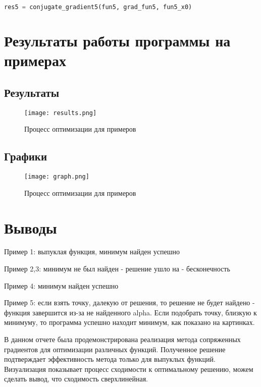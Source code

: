 \documentclass{article}
\begin{document}
\begin{lstlisting}[language=Python]
res5 = conjugate_gradient5(fun5, grad_fun5, fun5_x0)
\end{lstlisting}

\newpage
\section{Результаты работы программы на примерах}
\subsection{Результаты}

\begin{figure}[H]
    \centering
    \texttt{[image: results.png]}
    \caption{Процесс оптимизации для примеров}
\end{figure}
\newpage
\subsection{Графики}

\begin{figure}[H]
    \centering
    \texttt{[image: graph.png]}
    \caption{Процесс оптимизации для примеров}
\end{figure}

\newpage
\section{Выводы}
Пример 1: выпуклая функция, минимум найден успешно

Пример 2,3: минимум не был найден - решение ушло на - бесконечность

Пример 4: минимум найден успешно

Пример 5: если взять точку, далекую от решения, то решение не будет найдено - функция завершится из-за не найденного alpha. Если подобрать точку, близкую к минимуму, то программа успешно находит минимум, как показано на картинках.


В данном отчете была продемонстрирована реализация метода сопряженных градиентов для оптимизации различных функций. Полученное решение подтверждает эффективность метода только для выпуклых функций. Визуализация показывает процесс сходимости к оптимальному решению, можем сделать вывод, что сходимость сверхлинейная.
\end{document}
